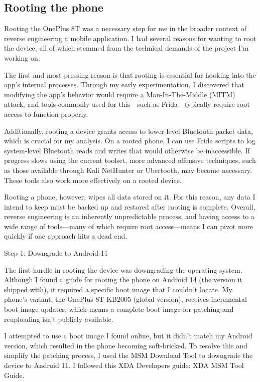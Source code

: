\subsection{Rooting the phone}
Rooting the OnePlus 8T was a necessary step for me in the broader context of reverse engineering a mobile application. I had several reasons for wanting to root the device, all of which stemmed from the technical demands of the project I’m working on.

The first and most pressing reason is that rooting is essential for hooking into the app's internal processes. Through my early experimentation, I discovered that modifying the app’s behavior would require a Man-In-The-Middle (MITM) attack, and tools commonly used for this—such as Frida—typically require root access to function properly.

Additionally, rooting a device grants access to lower-level Bluetooth packet data, which is crucial for my analysis. On a rooted phone, I can use Frida scripts to log system-level Bluetooth reads and writes that would otherwise be inaccessible. If progress slows using the current toolset, more advanced offensive techniques, such as those available through Kali NetHunter or Ubertooth, may become necessary. These tools also work more effectively on a rooted device.

Rooting a phone, however, wipes all data stored on it. For this reason, any data I intend to keep must be backed up and restored after rooting is complete. Overall, reverse engineering is an inherently unpredictable process, and having access to a wide range of tools—many of which require root access—means I can pivot more quickly if one approach hits a dead end.

Step 1: Downgrade to Android 11

The first hurdle in rooting the device was downgrading the operating system. Although I found a guide for rooting the phone on Android 14 (the version it shipped with), it required a specific boot image that I couldn’t locate. My phone’s variant, the OnePlus 8T KB2005 (global version), receives incremental boot image updates, which means a complete boot image for patching and reuploading isn't publicly available.

I attempted to use a boot image I found online, but it didn’t match my Android version, which resulted in the phone becoming soft-bricked. To resolve this and simplify the patching process, I used the MSM Download Tool to downgrade the device to Android 11. I followed this XDA Developers guide: XDA MSM Tool Guide.

